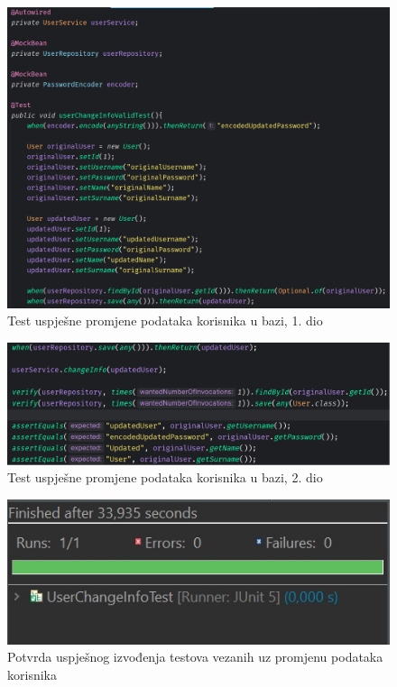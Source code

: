 			\begin{figure}[H]
			\includegraphics[scale=0.4]{slike/userChangeInfoValidTest1.PNG} %
			\centering
			\caption{Test uspješne promjene podataka korisnika u bazi, 1. dio}
			\label{Test uspješne promjene podataka korisnika u bazi, 1. dio}
		\end{figure}
		
								\begin{figure}[H]
			\includegraphics[scale=0.4]{slike/userChangeInfoValidTest2.PNG} %
			\centering
			\caption{Test uspješne promjene podataka korisnika u bazi, 2. dio}
			\label{Test uspješne promjene podataka korisnika u bazi, 2. dio}
		\end{figure}
		
		\begin{figure}[H]
			\includegraphics[scale=0.4]{slike/JUnit_change.JPG} %
			\centering
			\caption{Potvrda uspješnog izvođenja testova vezanih uz promjenu podataka korisnika}
			\label{Potvrda uspješnog izvođenja testova vezanih uz promjenu podataka korisnika}
		\end{figure}
			
